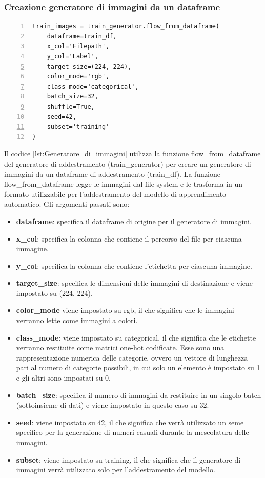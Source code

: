 \documentclass[a4paper,final,12pt]{report}
\begin{document}
\newpage
\subsubsection{Creazione generatore di immagini da un dataframe}
\begin{lstlisting}[caption={Creazione del generatore di immagini da un dataframe di addestramento.}, label={lst:Generatore_di_immagini}, breaklines, escapechar=`\%, frame=lines, basicstyle=\small\ttfamily, keepspaces=true, numbers=left]
train_images = train_generator.flow_from_dataframe(
    dataframe=train_df,
    x_col='Filepath',
    y_col='Label',
    target_size=(224, 224),
    color_mode='rgb',
    class_mode='categorical',
    batch_size=32,
    shuffle=True,
    seed=42,
    subset='training'
)
\end{lstlisting}
Il codice \ref{lst:Generatore_di_immagini} utilizza la funzione flow\_from\_dataframe del generatore di addestramento (train\_generator) per creare un generatore di immagini da un dataframe di addestramento (train\_df). La funzione flow\_from\_dataframe legge le immagini dal file system e le trasforma in un formato utilizzabile per l'addestramento del modello di apprendimento automatico. Gli argomenti passati sono:
\begin{itemize}
    \item \textbf{dataframe}: specifica il dataframe di origine per il generatore di immagini.
    \item \textbf{x\_col}: specifica la colonna che contiene il percorso del file per ciascuna immagine.
    \item \textbf{y\_col}: specifica la colonna che contiene l'etichetta per ciascuna immagine.
    \item \textbf{target\_size}: specifica le dimensioni delle immagini di destinazione e viene impostato su (224, 224).
    \item \textbf{color\_mode} viene impostato su rgb, il che significa che le immagini verranno lette come immagini a colori.
    \item \textbf{class\_mode}: viene impostato su categorical, il che significa che le etichette verranno restituite come matrici one-hot codificate. Esse sono una rappresentazione numerica delle categorie, ovvero un vettore di lunghezza pari al numero di categorie possibili, in cui solo un elemento è impostato su 1 e gli altri sono impostati su 0.
    \item \textbf{batch\_size}: specifica il numero di immagini da restituire in un singolo batch (sottoinsieme di dati) e viene impostato in questo caso su 32.
    \item \textbf{seed}: viene impostato su 42, il che significa che verrà utilizzato un seme specifico per la generazione di numeri casuali durante la mescolatura delle immagini.
     \item \textbf{subset}: viene impostato su training, il che significa che il generatore di immagini verrà utilizzato solo per l'addestramento del modello.
\end{itemize}
\end{document}
